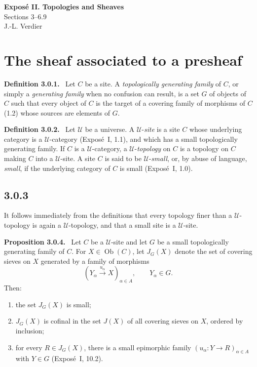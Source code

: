 \documentclass[11pt]{article}
\newcommand{\U}{\mathcal{U}}
\newcommand{\Ob}{\operatorname{Ob}}
\newenvironment{statement}[1]{\par\medskip\noindent\textbf{#1.}\ }{\par\medskip}
\begin{document}
\begin{center}
{\Large \textbf{Expos\'e II. Topologies and Sheaves}}\\[0.35em]
{\large Sections 3--6.9}\\[0.35em]
J.-L. Verdier
\end{center}

\bigskip


\setcounter{section}{2}
\section{The sheaf associated to a presheaf}

\begin{statement}{Definition 3.0.1}
Let \(C\) be a site. A \emph{topologically generating family} of \(C\), or simply a \emph{generating family} when no confusion can result, is a set \(G\) of objects of \(C\) such that every object of \(C\) is the target of a covering family of morphisms of \(C\) (1.2) whose sources are elements of \(G\).
\end{statement}

\begin{statement}{Definition 3.0.2}
Let \(\U\) be a universe. A \(\U\)-\emph{site} is a site \(C\) whose underlying category is a \(\U\)-category (Expos\'e~I, 1.1), and which has a small topologically generating family. If \(C\) is a \(\U\)-category, a \(\U\)-\emph{topology} on \(C\) is a topology on \(C\) making \(C\) into a \(\U\)-site. A site \(C\) is said to be \(\U\)-\emph{small}, or, by abuse of language, \emph{small}, if the underlying category of \(C\) is small (Expos\'e~I, 1.0).
\end{statement}

\subsection*{3.0.3}
It follows immediately from the definitions that every topology finer than a \(\U\)-topology is again a \(\U\)-topology, and that a small site is a \(\U\)-site.

\begin{statement}{Proposition 3.0.4}
Let \(C\) be a \(\U\)-site and let \(G\) be a small topologically generating family of \(C\). For \(X\in\Ob(C)\), let \(J_G(X)\) denote the set of covering sieves on \(X\) generated by a family of morphisms
\[
(Y_\alpha \xrightarrow{u_\alpha} X)_{\alpha\in A},\qquad Y_\alpha\in G.
\]
Then:
\begin{enumerate}[label=\arabic*)]
\item the set \(J_G(X)\) is small;
\item \(J_G(X)\) is cofinal in the set \(J(X)\) of all covering sieves on \(X\), ordered by inclusion;
\item for every \(R\in J_G(X)\), there is a small epimorphic family \((u_\alpha:Y\to R)_{\alpha\in A}\) with \(Y\in G\) (Expos\'e~I, 10.2).
\end{enumerate}
\end{statement}
\end{document}
